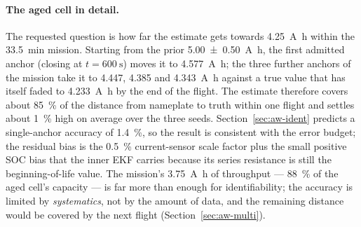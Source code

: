 \paragraph{The aged cell in detail.}  The requested question is how far the estimate gets towards
\SI{4.25}{\ampere\hour} within the \SI{33.5}{\minute} mission.  Starting from the prior
\SI{5.00\pm0.50}{\ampere\hour}, the first admitted anchor (closing at $t=\SI{600}{\second}$) moves it
to \SI{4.577}{\ampere\hour}; the three further anchors of the mission take it to
\SI{4.447}{}, \SI{4.385}{} and \SI{4.343}{\ampere\hour} against a true value that has itself faded to
\SI{4.233}{\ampere\hour} by the end of the flight.  The estimate therefore covers about
\SI{85}{\percent} of the distance from nameplate to truth within one flight and settles about
\SI{1}{\percent} high on average over the three seeds.  Section~\ref{sec:aw-ident} predicts a
single-anchor accuracy of \SI{1.4}{\percent}, so the result is consistent with the error budget; the
residual bias is the \SI{+0.5}{\percent} current-sensor scale factor plus the small positive SOC bias
that the inner EKF carries because its series resistance is still the beginning-of-life value.  The
mission's \SI{3.75}{\ampere\hour} of throughput --- \SI{88}{\percent} of the aged cell's capacity ---
is far more than enough for identifiability; the accuracy is limited by \emph{systematics}, not by
the amount of data, and the remaining distance would be covered by the next flight
(Section~\ref{sec:aw-multi}).

